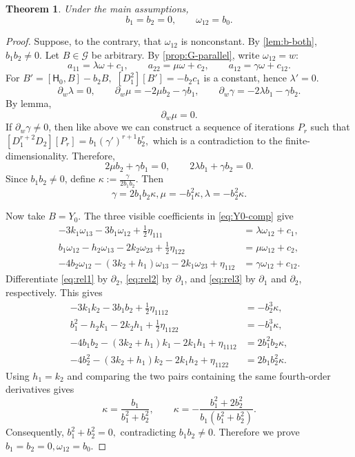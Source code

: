 \documentclass[11pt,a4paper]{article}
\numberwithin{equation}{section}
\theoremstyle{journalplain}
\newtheorem{theorem}{Theorem}[section]
\theoremstyle{journaldef}
\newcommand{\pd}{\partial}
\begin{document}
\begin{theorem}
\label{thm:w12-constant}
Under the main assumptions,
\[
b_1=b_2=0,
\qquad
\omega_{12}=b_0.
\]
\end{theorem}

\begin{tcolorbox}[
  title={Proof of Theorem~\ref{thm:w12-constant}},
  breakable
]
\begin{proof}
Suppose, to the contrary, that \(\omega_{12}\) is nonconstant. By
\cref{lem:b-both},
\(
b_1b_2\ne0.
\)
Let \(B\in\mathcal G\) be arbitrary. By
\cref{prop:G-parallel}, write $\omega_{12} = w$:
\[
a_{11}=\lambda\omega+c_1,
\qquad
a_{22}=\mu\omega+c_2,
\qquad
a_{12}=\gamma\omega+c_{12}.
\]
For
\(
B'=[\mathsf H_0,B]-b_2B,
\)
\(
[D_1^2][B']=-b_2c_1
\)
is a constant, hence $\lambda' = 0$.
\[
\partial_w\lambda=0,
\qquad
\partial_w\mu=-2\mu b_2-\gamma b_1,
\qquad
\partial_w\gamma=-2\lambda b_1-\gamma b_2.
\]
By lemma,
\[
\partial_w\mu = 0.
\]
If $\partial_w \gamma \neq 0$, then like above we can construct a sequence of iterations $P_r$ such that 
\([D_1^{r+2}D_2][P_r]
=
b_1(\gamma')^{r+1}b_2^r,\) which is a contradiction to the finite-dimensionality. Therefore,
\[
2\mu b_2+\gamma b_1=0,
\qquad
2\lambda b_1+\gamma b_2=0.
\]
Since \(b_1b_2\ne0\), define
\(
\kappa:=\frac{\gamma}{2b_1b_2}.
\)
Then
\[
\gamma=2b_1b_2\kappa,
\mu=-b_1^2\kappa,
\lambda=-b_2^2\kappa.
\]

Now take \(B= Y_0\). The three visible coefficients in
\eqref{eq:Y0-comp} give
\begin{align}
-3k_1\omega_{13}-3b_1\omega_{12}
+\frac12\eta_{111}
&=\lambda\omega_{12}+c_1,
\label{eq:rel1}\\
b_1\omega_{12}-h_2\omega_{13}-2k_2\omega_{23}
+\frac12\eta_{122}
&=\mu\omega_{12}+c_2,
\label{eq:rel2}\\
-4b_2\omega_{12}-(3k_2+h_1)\omega_{13}
-2k_1\omega_{23}+\eta_{112}
&=\gamma\omega_{12}+c_{12}.
\label{eq:rel3}
\end{align}
Differentiate \eqref{eq:rel1} by \(\pd_2\),
\eqref{eq:rel2} by \(\pd_1\), and \eqref{eq:rel3}
by \(\pd_1\) and \(\pd_2\), respectively. This gives
\begin{align}
-3k_1k_2-3b_1b_2+\frac12\eta_{1112}
&=-b_2^3\kappa,
\label{eq:elim1}\\
b_1^2-h_2k_1-2k_2h_1+\frac12\eta_{1122}
&=-b_1^3\kappa,
\label{eq:elim2}\\
-4b_1b_2-(3k_2+h_1)k_1-2k_1h_1+\eta_{1112}
&=2b_1^2b_2\kappa,
\label{eq:elim3}\\
-4b_2^2-(3k_2+h_1)k_2-2k_1h_2+\eta_{1122}
&=2b_1b_2^2\kappa.
\label{eq:elim4}
\end{align}
Using \(h_1=k_2\) and comparing the two pairs containing the same
fourth-order derivatives gives
\[
\kappa=\frac{b_1}{b_1^2+b_2^2},
\qquad
\kappa=
-\frac{b_1^2+2b_2^2}
{b_1(b_1^2+b_2^2)}.
\]
Consequently,
\(
b_1^2+b_2^2=0,
\)
contradicting \(b_1b_2\ne0\). Therefore we prove
\(
b_1=b_2=0,
\omega_{12}=b_0.
\)
\end{proof}
\end{tcolorbox}
\end{document}
